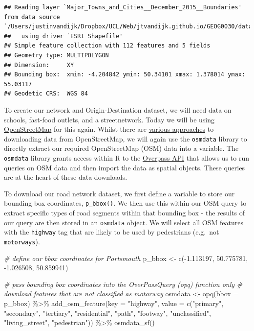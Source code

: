 \documentclass[
]{book}
\newenvironment{Shaded}{\begin{snugshade}}{\end{snugshade}}
\newcommand{\AttributeTok}[1]{\textcolor[rgb]{0.77,0.63,0.00}{#1}}
\newcommand{\CommentTok}[1]{\textcolor[rgb]{0.56,0.35,0.01}{\textit{#1}}}
\newcommand{\FloatTok}[1]{\textcolor[rgb]{0.00,0.00,0.81}{#1}}
\newcommand{\FunctionTok}[1]{\textcolor[rgb]{0.00,0.00,0.00}{#1}}
\newcommand{\NormalTok}[1]{#1}
\newcommand{\OtherTok}[1]{\textcolor[rgb]{0.56,0.35,0.01}{#1}}
\newcommand{\SpecialCharTok}[1]{\textcolor[rgb]{0.00,0.00,0.00}{#1}}
\newcommand{\StringTok}[1]{\textcolor[rgb]{0.31,0.60,0.02}{#1}}
\begin{document}
\begin{verbatim}
## Reading layer `Major_Towns_and_Cities__December_2015__Boundaries' from data source `/Users/justinvandijk/Dropbox/UCL/Web/jtvandijk.github.io/GEOG0030/data/raw/outline/Major_Towns_and_Cities__December_2015__Boundaries.shp' 
##   using driver `ESRI Shapefile'
## Simple feature collection with 112 features and 5 fields
## Geometry type: MULTIPOLYGON
## Dimension:     XY
## Bounding box:  xmin: -4.204842 ymin: 50.34101 xmax: 1.378014 ymax: 55.03117
## Geodetic CRS:  WGS 84
\end{verbatim}

To create our network and Origin-Destination dataset, we will need data on schools, fast-food outlets, and a streetnetwork. Today we will be using \href{https://www.openstreetmap.org}{OpenStreetMap} for this again. Whilst there are \href{https://wiki.openstreetmap.org/wiki/Downloading_data}{various approaches} to downloading data from OpenStreetMap, we will again use the \texttt{osmdata} library to directly extract our required OpenStreetMap (OSM) data into a variable. The \texttt{osmdata} library grants access within R to the \href{https://overpass-turbo.eu/}{Overpass API} that allows us to run queries on OSM data and then import the data as spatial objects. These queries are at the heart of these data downloads.

To download our road network dataset, we first define a variable to store our bounding box coordinates, \texttt{p\_bbox()}. We then use this within our OSM query to extract specific types of road segments within that bounding box - the results of our query are then stored in an \texttt{osmdata} object. We will select all OSM features with the \texttt{highway} tag that are likely to be used by pedestrians (e.g.~not \texttt{motorways}).

\begin{Shaded}
\begin{Highlighting}[]
\CommentTok{\# define our bbox coordinates for Portsmouth}
\NormalTok{p\_bbox }\OtherTok{\textless{}{-}} \FunctionTok{c}\NormalTok{(}\SpecialCharTok{{-}}\FloatTok{1.113197}\NormalTok{, }\FloatTok{50.775781}\NormalTok{, }\SpecialCharTok{{-}}\FloatTok{1.026508}\NormalTok{, }\FloatTok{50.859941}\NormalTok{)}

\CommentTok{\# pass bounding box coordinates into the OverPassQuery (opq) function only}
\CommentTok{\# download features that are not classified as motorway}
\NormalTok{osmdata }\OtherTok{\textless{}{-}} \FunctionTok{opq}\NormalTok{(}\AttributeTok{bbox =}\NormalTok{ p\_bbox) }\SpecialCharTok{\%\textgreater{}\%}
    \FunctionTok{add\_osm\_feature}\NormalTok{(}\AttributeTok{key =} \StringTok{"highway"}\NormalTok{, }\AttributeTok{value =} \FunctionTok{c}\NormalTok{(}\StringTok{"primary"}\NormalTok{, }\StringTok{"secondary"}\NormalTok{, }\StringTok{"tertiary"}\NormalTok{,}
        \StringTok{"residential"}\NormalTok{, }\StringTok{"path"}\NormalTok{, }\StringTok{"footway"}\NormalTok{, }\StringTok{"unclassified"}\NormalTok{, }\StringTok{"living\_street"}\NormalTok{, }\StringTok{"pedestrian"}\NormalTok{)) }\SpecialCharTok{\%\textgreater{}\%}
    \FunctionTok{osmdata\_sf}\NormalTok{()}
\end{Highlighting}
\end{Shaded}
\end{document}
